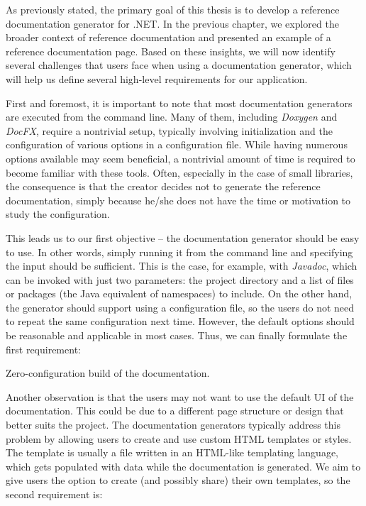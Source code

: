 As previously stated, the primary goal of this thesis is to develop a reference documentation generator for .NET.
In the previous chapter, we explored the broader context of reference documentation and presented an example of a reference documentation page.
Based on these insights, we will now identify several challenges that users face when using a documentation generator, which will help us define several high-level requirements for our application.

First and foremost, it is important to note that most documentation generators are executed from the command line.
Many of them, including \textit{Doxygen} and \textit{DocFX}, require a nontrivial setup, typically involving initialization and the configuration of various options in a configuration file.
While having numerous options available may seem beneficial, a nontrivial amount of time is required to become familiar with these tools.
Often, especially in the case of small libraries, the consequence is that the creator
decides not to generate the reference documentation, simply because he/she does not have the time or motivation to study the configuration. 

This leads us to our first objective -- the documentation generator should be easy to use.
In other words, simply running it from the command line and specifying the input should be sufficient. 
This is the case, for example, with \textit{Javadoc}, which can be invoked with just two parameters: 
the project directory and a list of files or packages (the Java equivalent of namespaces) to include.
On the other hand, the generator should support using a configuration file, so the users do not need to repeat the same configuration next time.
However, the default options should be reasonable and applicable in most cases.
Thus, we can finally formulate the first requirement:

\begin{requirement}
    Zero-configuration build of the documentation.
    \label{req:zero-conf}
\end{requirement}

Another observation is that the users may not want to use the default UI of the documentation. 
This could be due to a different page structure or design that better suits the project.
The documentation generators typically address this problem by allowing users to create and use custom HTML templates or styles.
The template is usually a file written in an HTML-like templating language, which gets populated with data while the documentation is generated.
We aim to give users the option to create (and possibly share) their own templates, so the second requirement is:

